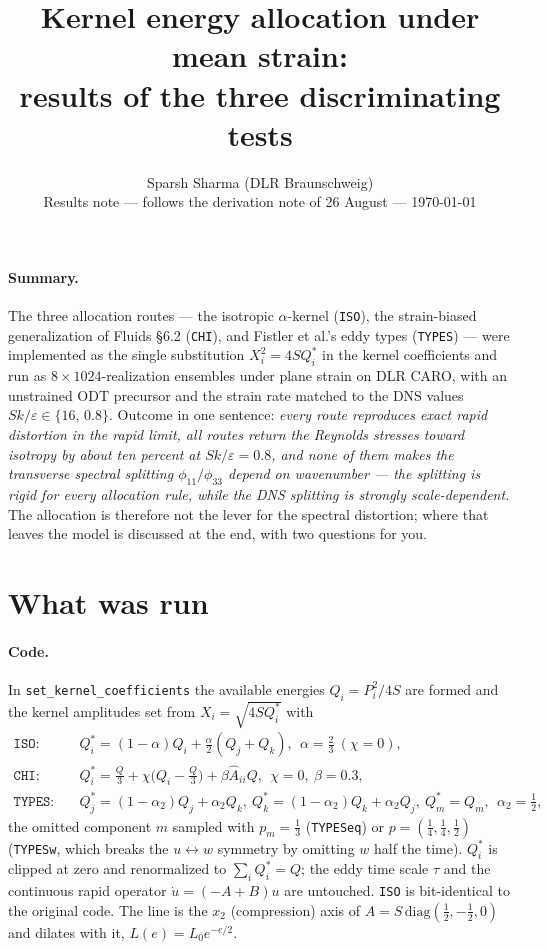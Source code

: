 \documentclass[11pt,a4paper]{article}
\title{\vspace{-1.2em}Kernel energy allocation under mean strain:\\
results of the three discriminating tests}
\author{Sparsh Sharma (DLR Braunschweig)\\[0.2em]
\normalsize Results note --- follows the derivation note of 26 August --- \today}
\date{}
\newcommand{\Qs}{Q^{*}}
\begin{document}
\maketitle
\vspace{-2em}

\paragraph{Summary.} The three allocation routes --- the isotropic
$\alpha$-kernel (\texttt{ISO}), the strain-biased generalization of Fluids
\S6.2 (\texttt{CHI}), and Fistler et al.'s eddy types (\texttt{TYPES}) ---
were implemented as the single substitution $X_i^2=4S\Qs_i$ in the kernel
coefficients and run as $8\times1024$-realization ensembles under plane
strain on DLR CARO, with an unstrained ODT precursor and the strain rate
matched to the DNS values $Sk/\varepsilon\in\{16,\,0.8\}$. Outcome in one
sentence: \emph{every route reproduces exact rapid distortion in the rapid
limit, all routes return the Reynolds stresses toward isotropy by about
ten percent at $Sk/\varepsilon=0.8$, and none of them makes the transverse
spectral splitting $\phi_{11}/\phi_{33}$ depend on wavenumber --- the
splitting is rigid for every allocation rule, while the DNS splitting is
strongly scale-dependent.} The allocation is therefore not the lever for
the spectral distortion; where that leaves the model is discussed at the
end, with two questions for you.

\section{What was run}

\paragraph{Code.} In \texttt{set\_kernel\_coefficients} the available
energies $Q_i=P_i^2/4S$ are formed and the kernel amplitudes set from
$X_i=\sqrt{4S\Qs_i}$ with
\begin{align}
  \texttt{ISO}:&\quad \Qs_i=(1-\alpha)Q_i+\tfrac{\alpha}{2}(Q_j+Q_k),\ \ \alpha=\tfrac23
  \ (\chi=0), \\
  \texttt{CHI}:&\quad \Qs_i=\tfrac{Q}{3}+\chi\bigl(Q_i-\tfrac{Q}{3}\bigr)+\beta\hat A_{ii}Q,
  \ \ \chi=0,\ \beta=0.3, \\
  \texttt{TYPES}:&\quad \Qs_j=(1-\alpha_2)Q_j+\alpha_2Q_k,\ \Qs_k=(1-\alpha_2)Q_k+\alpha_2Q_j,\ \Qs_m=Q_m,
  \ \ \alpha_2=\tfrac12,
\end{align}
the omitted component $m$ sampled with $p_m=\tfrac13$ (\texttt{TYPESeq})
or $p=(\tfrac14,\tfrac14,\tfrac12)$ (\texttt{TYPESw}, which breaks the
$u\leftrightarrow w$ symmetry by omitting $w$ half the time). $\Qs_i$ is
clipped at zero and renormalized to $\sum_i\Qs_i=Q$; the eddy time scale
$\tau$ and the continuous rapid operator $\dot u=(-A+B)u$ are untouched.
\texttt{ISO} is bit-identical to the original code. The line is the $x_2$
(compression) axis of $A=S\,\mathrm{diag}(\tfrac12,-\tfrac12,0)$ and
dilates with it, $L(e)=L_0e^{-e/2}$.
\end{document}
